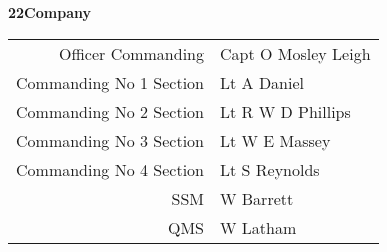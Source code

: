 \pagebreak

\begin{center}
  \Large
  \textbf{22\nd Company}
\end{center}

\vspace*{3mm}

\begin{center}
  \begin{tabular}{rl}
    Officer Commanding & Capt O Mosley Leigh \\
    Commanding No 1 Section & Lt A Daniel \\
    Commanding No 2 Section & Lt R W D Phillips \\
    Commanding No 3 Section & Lt W E Massey \\
    Commanding No 4 Section & Lt S Reynolds \\
    SSM & W Barrett \\
    QMS & W Latham \\
  \end{tabular}
\end{center}

\vspace*{3mm}

